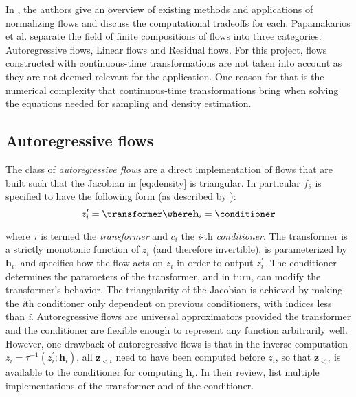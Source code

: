 \documentclass[english]{scrartcl}
\begin{document}
    In \cite{papamakarios_normalizing_2019}, the authors give an overview of existing methods and applications of normalizing flows and discuss the computational tradeoffs for each.
    Papamakarios et al. separate the field of finite compositions of flows into three categories: Autoregressive flows, Linear flows and Residual flows.
    For this project, flows constructed with continuous-time transformations are not taken into account as they are not deemed relevant for the application.
    One reason for that is the numerical complexity that continuous-time transformations bring when solving the equations needed for sampling and density estimation.

    \subsection{Autoregressive flows}
    The class of \textit{autoregressive flows} are a direct implementation of flows that are built such that the Jacobian in \cref{eq:density} is triangular.
    In particular $f_{\theta}$ is specified to have the following form (as described by \cite{papamakarios_normalizing_2019}):
    \begin{equation}
        z_i^{\prime} = \transformer \where \textbf{h}_i = \conditioner
    \end{equation}

    where $\tau$ is termed the \textit{transformer} and $c_i$ the \textit{i}-th \textit{conditioner}.
    The transformer is a strictly monotonic function of $z_i$ (and therefore invertible), is parameterized by $\textbf{h}_i$, and specifies how the flow acts on $z_i$ in order to output $z_i^{\prime}$.
    The conditioner determines the parameters of the transformer, and in turn, can modify the transformer's behavior.
    The triangularity of the Jacobian is achieved by making the \textit{i}th conditioner only dependent on previous conditioners, with indices less than \textit{i}.
    Autoregressive flows are universal approximators provided the transformer and the conditioner are flexible enough to represent any function arbitrarily well.
    However, one drawback of autoregressive flows is that in the inverse computation $z_i = \tau ^{-1} (z_i ^{\prime}; \textbf{h}_i)$, all $\textbf{z}_{<i}$ need to have been computed before $z_i$, so that $\textbf{z}_{<i}$ is available to the conditioner for computing $\textbf{h}_i$.
    In their review, \cite{papamakarios_normalizing_2019} list multiple implementations of the transformer and of the conditioner.
\end{document}
